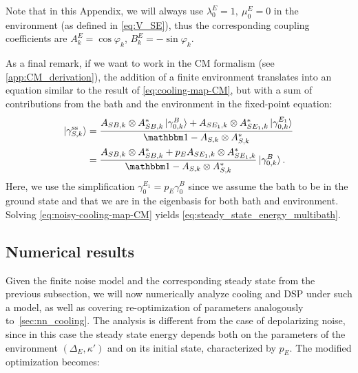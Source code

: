 Note that in this Appendix, we will always use $\lambda_0^E=1,\ \mu_0^E=0$ in the environment (as defined in \cref{eq:V_SE}), thus the corresponding coupling coefficients are $A_k^E=\cos\varphi_k$, $B_k^E=-\sin\varphi_k$.

As a final remark, if we want to work in the CM formalism (see \cref{app:CM_derivation}), the addition of a finite environment translates into an equation similar to the result of \cref{eq:cooling-map-CM}, but with a sum of contributions from the bath and the environment in the fixed-point equation:
\begin{align}
    \ket{\gamma_{S,k}^\text{ss}} &= \frac{A_{SB,k}\otimes A^*_{SB,k}\ket{\gamma_{0,k}^B}+A_{SE_1,k}\otimes A^*_{SE_1,k}\ket{\gamma_{0,k}^{E_1}}}{\Id-A_{S,k}\otimes A^*_{S,k}}\nonumber\\
                                 &= \frac{A_{SB,k}\otimes A^*_{SB,k}+p_E A_{SE_1,k}\otimes A^*_{SE_1,k}}{\Id-A_{S,k}\otimes A^*_{S,k}}\ket{\gamma_{0,k}^{B}}.
    \label{eq:noisy-cooling-map-CM}
\end{align}
Here, we use the simplification $\gamma_0^{E_1}=p_E\gamma_0^B$ since we assume the bath to be in the ground state and that we are in the eigenbasis for both bath and environment. Solving \cref{eq:noisy-cooling-map-CM} yields \cref{eq:steady_state_energy_multibath}.

\subsection{Numerical results}
\label{subapp:finite_noise_numerics}
Given the finite noise model and the corresponding steady state from the previous subsection, we will now numerically analyze cooling and DSP under such a model, as well as covering re-optimization of parameters analogously to~\cref{sec:nn_cooling}. The analysis is different from the case of depolarizing noise, since in this case the steady state energy depends both on the parameters of the environment $(\Delta_E, \kappa')$ and on its initial state, characterized by $p_E$. The modified optimization becomes:


